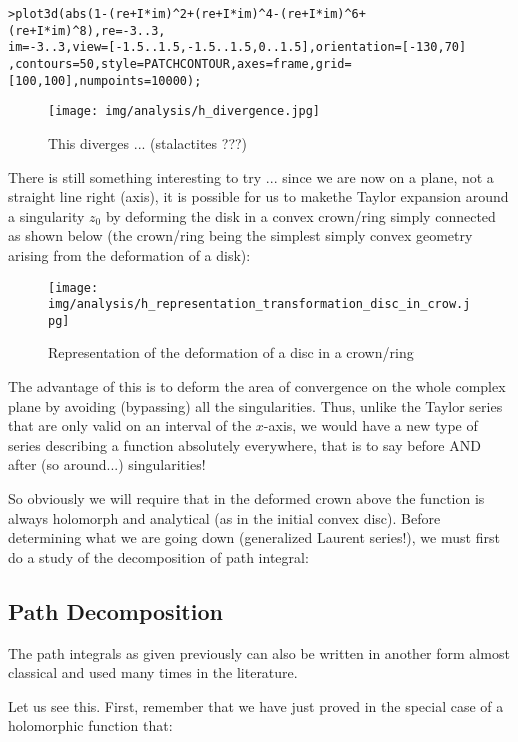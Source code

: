 	\texttt{>plot3d(abs(1-(re+I*im)\string^2+(re+I*im)\string^4-(re+I*im)\string^6+(re+I*im)\string^8),re=-3..3,\\
im=-3..3,view=[-1.5..1.5,-1.5..1.5,0..1.5],orientation=[-130,70]\\
	,contours=50,style=PATCHCONTOUR,axes=frame,grid=[100,100],numpoints=10000);}
	
	\begin{figure}[H]
		\begin{center}
			\texttt{[image: img/analysis/h\_divergence.jpg]}
		\end{center}	
		\caption{This diverges ... (stalactites ???)}
	\end{figure}
	There is still something interesting to try ... since we are now on a plane, not a straight line right (axis), it is possible for us to makethe Taylor expansion around a singularity $z_0$ by deforming the disk in a convex crown/ring simply connected as shown below (the crown/ring being the simplest simply convex geometry arising from the deformation of a disk):
	\begin{figure}[H]
		\begin{center}
			\texttt{[image: img/analysis/h\_representation\_transformation\_disc\_in\_crow.jpg]}
		\end{center}	
		\caption{Representation of the deformation of a disc in a crown/ring}
	\end{figure}
	The advantage of this is to deform the area of convergence on the whole complex plane by avoiding (bypassing) all the singularities. Thus, unlike the Taylor series that are only valid on an interval of the $x$-axis, we would have a new type of series describing a function absolutely everywhere, that is to say before AND after (so around...) singularities!
	
	So obviously we will require that in the deformed crown above the function is always holomorph and analytical (as in the initial convex disc). Before determining what we are going down (generalized Laurent series!), we must first do a study of the decomposition of path integral:
	
	\pagebreak
	\subsection{Path Decomposition}
	The path integrals as given previously can also be written in another form almost classical and used many times in the literature.
	
	Let us see this. First, remember that we have just proved in the special case of a holomorphic function that:
	
